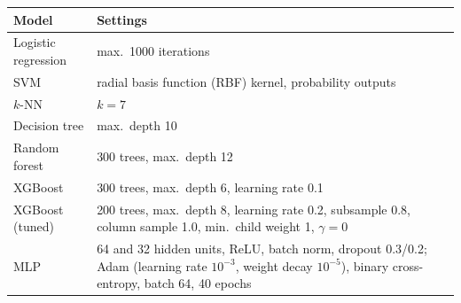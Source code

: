 \begin{tabular}{@{}lp{5.6cm}@{}}
\toprule
Model & Settings \\
\midrule
Logistic regression & max.\ 1000 iterations \\
SVM & radial basis function (RBF) kernel, probability outputs \\
$k$-NN & $k = 7$ \\
Decision tree & max.\ depth 10 \\
Random forest & 300 trees, max.\ depth 12 \\
XGBoost & 300 trees, max.\ depth 6, learning rate 0.1 \\
XGBoost (tuned) & 200 trees, max.\ depth 8, learning rate 0.2, subsample 0.8, column sample 1.0, min.\ child weight 1, $\gamma = 0$ \\
MLP & 64 and 32 hidden units, ReLU, batch norm, dropout 0.3/0.2; Adam (learning rate $10^{-3}$, weight decay $10^{-5}$), binary cross-entropy, batch 64, 40 epochs \\
\bottomrule
\end{tabular}
